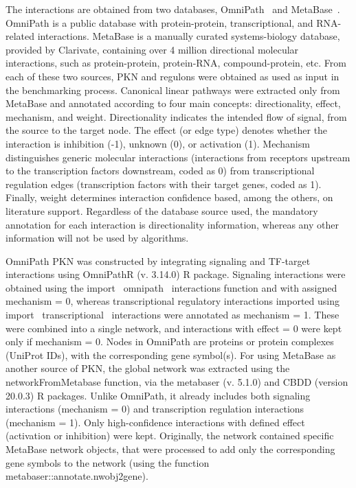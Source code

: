 The interactions are obtained from two databases, OmniPath~\cite{RN91} and MetaBase~\cite{RN33}. 
OmniPath is a public database with protein-protein, transcriptional, and \gls{RNA}-related interactions. MetaBase is a manually curated systems-biology database, provided by Clarivate, containing over 4 million directional molecular interactions, such as protein-protein, protein-\gls{RNA}, compound-protein, etc. 
From each of these two sources, PKN and regulons were obtained as used as input in the benchmarking process. Canonical linear pathways were extracted only from MetaBase and annotated according to four main concepts: directionality, effect, mechanism, and weight. 
Directionality indicates the intended flow of signal, from the source to the target node. 
The effect (or edge type) denotes whether the interaction is inhibition (-1), unknown (0), or activation (1). 
Mechanism distinguishes generic molecular interactions (interactions from receptors upstream to the transcription factors downstream, coded as 0) from transcriptional regulation edges (transcription factors with their target genes, coded as 1). 
Finally, weight determines interaction confidence based, among the others, on literature support. Regardless of the database source used, the mandatory annotation for each interaction is directionality information, whereas any other information will not be used by algorithms. 

OmniPath \gls{PKN} was constructed by integrating signaling and \gls{TF}-target interactions using OmniPathR (v. 3.14.0) \gls{R} package. 
Signaling interactions were obtained using the import \ omnipath \ interactions function and with assigned mechanism = 0, whereas transcriptional regulatory interactions imported using import \ transcriptional \ interactions were annotated as mechanism = 1. 
These were combined into a single network, and interactions with effect = 0 were kept only if mechanism = 0. Nodes in OmniPath are proteins or protein complexes (UniProt IDs), with the corresponding gene symbol(s). 
For using MetaBase as another source of PKN, the global network was extracted using the networkFromMetabase function, via the metabaser (v. 5.1.0) and \gls{CBDD} (version 20.0.3) R packages. 
Unlike OmniPath, it already includes both signaling interactions (mechanism = 0) and transcription regulation interactions (mechanism = 1). 
Only high-confidence interactions with defined effect (activation or inhibition) were kept. 
Originally, the network contained specific MetaBase network objects, that were processed to add only the corresponding gene symbols to the network (using the function metabaser::annotate.nwobj2gene).

